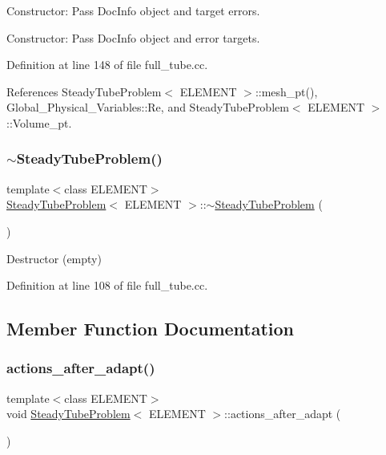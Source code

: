 Constructor\+: Pass Doc\+Info object and target errors. 

Constructor\+: Pass Doc\+Info object and error targets. 

Definition at line 148 of file full\+\_\+tube.\+cc.



References Steady\+Tube\+Problem$<$ E\+L\+E\+M\+E\+N\+T $>$\+::mesh\+\_\+pt(), Global\+\_\+\+Physical\+\_\+\+Variables\+::\+Re, and Steady\+Tube\+Problem$<$ E\+L\+E\+M\+E\+N\+T $>$\+::\+Volume\+\_\+pt.

\mbox{\label{classSteadyTubeProblem_a1564d3faf03e6724565097e730d099d5}} 
\subsubsection{\texorpdfstring{$\sim$\+Steady\+Tube\+Problem()}{~SteadyTubeProblem()}}
{\footnotesize\ttfamily template$<$class E\+L\+E\+M\+E\+NT$>$ \\
\hyperlink{classSteadyTubeProblem}{Steady\+Tube\+Problem}$<$ E\+L\+E\+M\+E\+NT $>$\+::$\sim$\hyperlink{classSteadyTubeProblem}{Steady\+Tube\+Problem} (\begin{DoxyParamCaption}{ }\end{DoxyParamCaption})\hspace{0.3cm}{\ttfamily [inline]}}



Destructor (empty) 



Definition at line 108 of file full\+\_\+tube.\+cc.



\subsection{Member Function Documentation}
\mbox{\label{classSteadyTubeProblem_ae598a2a0ec9bbfb563a1c78aa159561f}} 
\subsubsection{\texorpdfstring{actions\+\_\+after\+\_\+adapt()}{actions\_after\_adapt()}}
{\footnotesize\ttfamily template$<$class E\+L\+E\+M\+E\+NT$>$ \\
void \hyperlink{classSteadyTubeProblem}{Steady\+Tube\+Problem}$<$ E\+L\+E\+M\+E\+NT $>$\+::actions\+\_\+after\+\_\+adapt (\begin{DoxyParamCaption}{ }\end{DoxyParamCaption})\hspace{0.3cm}{\ttfamily [inline]}}



